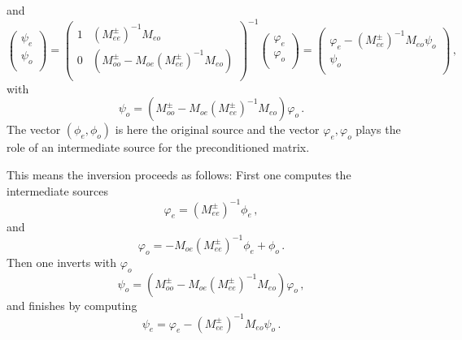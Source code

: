 and
\[
\begin{pmatrix}
  \psi_e \\ \psi_o \\
\end{pmatrix}
=
\begin{pmatrix}
  1       & (M_{ee}^\pm)^{-1}M_{eo}\\
  0       & (M_{oo}^\pm-M_{oe}(M_{ee}^\pm)^{-1}M_{eo})\\
\end{pmatrix}^{-1}
\begin{pmatrix}
  \varphi_e \\ \varphi_o \\
\end{pmatrix}
=
\begin{pmatrix}
  \varphi_e - (M_{ee}^\pm)^{-1}M_{eo}\psi_o \\ \psi_o \\
\end{pmatrix}\, ,
\]
with
\[
\psi_o = (M_{oo}^\pm-M_{oe}(M_{ee}^\pm)^{-1}M_{eo}) \varphi_o\, .
\]
The vector $(\phi_e,\phi_o)$ is here the original source and the vector
$\varphi_e, \varphi_o$ plays the role of an intermediate source for the
preconditioned matrix.

\noindent This means the inversion proceeds as follows: First one
computes the intermediate sources
\[
\varphi_e = (M_{ee}^\pm)^{-1} \phi_e\, ,
\]
and
\[
\varphi_o = -M_{oe}( M_{ee}^\pm)^{-1} \phi_e + \phi_o\, .
\]
Then one inverts with $\varphi_o$
\[
\psi_o = (M_{oo}^\pm-M_{oe}(M_{ee}^\pm)^{-1}M_{eo}) \varphi_o\, ,
\]
and finishes by computing
\[
\psi_e = \varphi_e - (M_{ee}^\pm)^{-1}M_{eo}\psi_o\, .
\]
